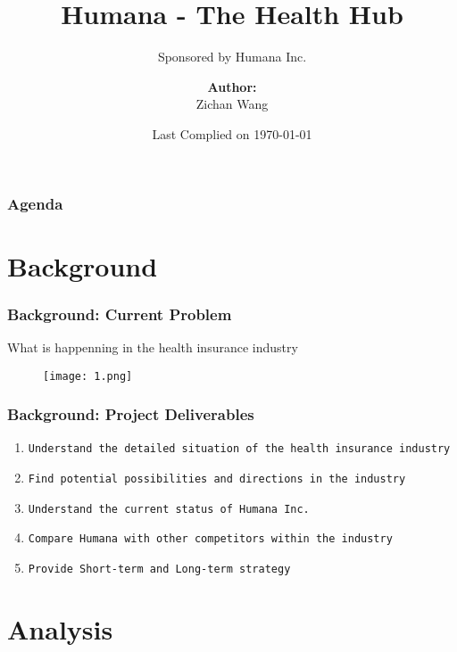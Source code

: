\documentclass[compress,handout,10pt]{beamer}
\title{{\color{blue} \LARGE Humana - The Health Hub \newline} }
\subtitle{{\color{red} \large Sponsored by Humana Inc.} }
\author{ 
    {\bf{Author:}} \\ 
Zichan Wang \\ 
    \vspace{5pt}
}
\institute{JHU 2012 FALL}
\date{\mygreen Last Complied on \today}
\let\olditem\item
\renewcommand{\item}{\setlength{\itemsep}{0.5\baselineskip}\olditem}
\begin{document}
\begin{frame}[plain]
    \titlepage
\end{frame}

\begin{frame}
    \frametitle{Agenda}
    \tableofcontents
\end{frame}





\section{\large Background}





\begin{frame}[dresden]
   \frametitle{Background: Current Problem}
What is happenning in the health insurance industry
\newline 
\begin{figure}[h]
    \begin{center}
        \texttt{[image: 1.png]}
    \end{center}
    \caption{}
    \label{fig:seats}
\end{figure}
\end{frame}

\begin{frame}
    \frametitle{Background: Project Deliverables}
            \begin{enumerate}  
                \item \texttt{Understand the detailed situation of the health insurance industry }
                 \item \texttt{Find potential possibilities and directions in the industry}  
                \item \texttt{Understand the current status of Humana Inc.}   
                \item \texttt{Compare Humana with other competitors within the industry}             
                 \item \texttt{Provide Short-term and Long-term strategy}        
            \end{enumerate}
\end{frame}







\section{\large Analysis}
\end{document}
